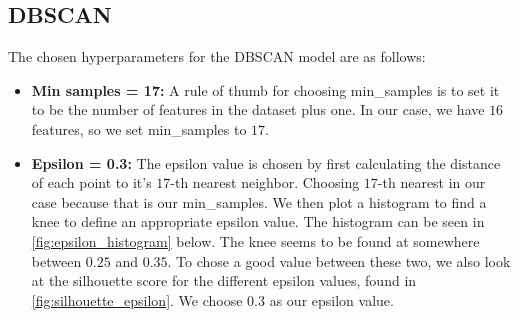 \subsection{DBSCAN}

The chosen hyperparameters for the DBSCAN model are as follows:

\begin{itemize}
    \item \textbf{Min samples = 17:} A rule of thumb for choosing min\_samples is to set it to be the number of features in the dataset plus one. In our case, we have $16$ features, so we set min\_samples to $17$.
    \item \textbf{Epsilon = 0.3:} The epsilon value is chosen by first calculating the distance of each point to it's $17$-th nearest neighbor. Choosing $17$-th nearest in our case because that is our min\_samples. We then plot a histogram to find a knee to define an appropriate epsilon value. The histogram can be seen in \autoref{fig:epsilon_histogram} below. The knee seems to be found at somewhere between $0.25$ and $0.35$. To chose a good value between these two, we also look at the silhouette score for the different epsilon values, found in \autoref{fig:silhouette_epsilon}. We choose $0.3$ as our epsilon value.
\end{itemize}

